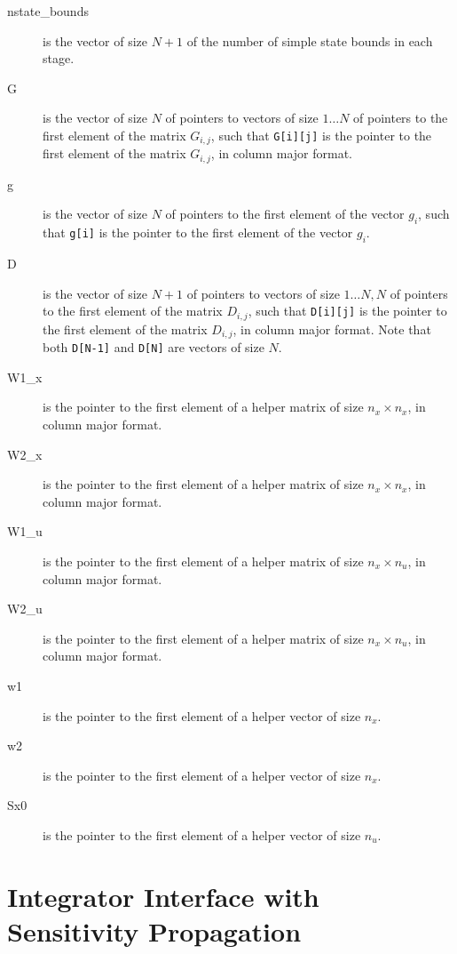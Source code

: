 \documentclass{report}
\begin{document}
\begin{description}
\begin{description}
		\item[nstate\_bounds] is the vector of size $N+1$ of the number of simple state bounds in each stage.
		\item[G] is the vector of size $N$ of pointers to vectors of size $1 \ldots N$ of pointers to the first element of the matrix $G_{i,j}$, such that \texttt{G[i][j]} is the pointer to the first element of the matrix $G_{i,j}$, in column major format.
		\item[g] is the vector of size $N$ of pointers to the first element of the vector $g_i$, such that \texttt{g[i]} is the pointer to the first element of the vector $g_i$.
		\item[D] is the vector of size $N+1$ of pointers to vectors of size $1 \ldots N, N$ of pointers to the first element of the matrix $D_{i,j}$, such that \texttt{D[i][j]} is the pointer to the first element of the matrix $D_{i,j}$, in column major format. Note that both \texttt{D[N-1]} and \texttt{D[N]} are vectors of size $N$.
		\item[W1\_x] is the pointer to the first element of a helper matrix of size $n_x \times n_x$, in column major format.
		\item[W2\_x] is the pointer to the first element of a helper matrix of size $n_x \times n_x$, in column major format.
		\item[W1\_u] is the pointer to the first element of a helper matrix of size $n_x \times n_u$, in column major format.
		\item[W2\_u] is the pointer to the first element of a helper matrix of size $n_x \times n_u$, in column major format.
		\item[w1] is the pointer to the first element of a helper vector of size $n_x$.
		\item[w2] is the pointer to the first element of a helper vector of size $n_x$.
		\item[Sx0] is the pointer to the first element of a helper vector of size $n_u$.
	\end{description}
\end{description}

\section{Integrator Interface with Sensitivity Propagation}
\end{document}
